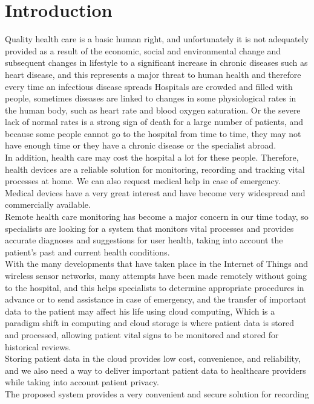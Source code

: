 \documentclass{bmcart}
\begin{document}
\section*{Introduction}
Quality health care is a basic human right, and unfortunately it is not
adequately provided as a result of the economic, social and environmental change
and subsequent changes in lifestyle to a significant increase in chronic
diseases such as heart disease, and this represents a major threat to human
health and therefore every time an infectious disease spreads Hospitals are
crowded and filled with people, sometimes diseases are linked to changes in some
physiological rates in the human body, such as heart rate and blood oxygen
saturation. Or the severe lack of normal rates is a strong sign of death for a
large number of patients, and because some people cannot go to the hospital from
time to time, they may not have enough time or they have a chronic disease or
the specialist abroad.\\
In addition, health care may cost the hospital a lot for these people.
Therefore, health devices are a reliable solution for monitoring, recording and
tracking vital processes at home. We can also request medical help in case of
emergency. Medical devices have a very great interest and have become very
widespread and commercially available.\\
Remote health care monitoring has become a major concern in our time today, so
specialists are looking for a system that monitors vital processes and provides
accurate diagnoses and suggestions for user health, taking into account the
patient's past and current health conditions.\\
With the many developments that have taken place in the Internet of Things and
wireless sensor networks, many attempts have been made remotely without going to
the hospital, and this helps specialists to determine appropriate procedures in
advance or to send assistance in case of emergency, and the transfer of
important data to the patient may affect his life using cloud computing, Which
is a paradigm shift in computing and cloud storage is where patient data is
stored and processed, allowing patient vital signs to be monitored and stored
for historical reviews.\\
Storing patient data in the cloud provides low cost, convenience, and
reliability, and we also need a way to deliver important patient data to
healthcare providers while taking into account patient privacy.\\
The proposed system provides a very convenient and secure solution for recording
\end{document}

